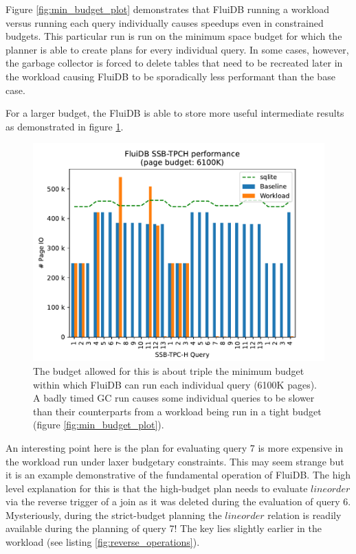 Figure \ref{fig:min_budget_plot} demonstrates that FluiDB running a
workload versus running each query individually causes speedups even
in constrained budgets. This particular run is run on the minimum
space budget for which the planner is able to create plans for every
individual query. In some cases, however, the garbage collector is
forced to delete tables that need to be recreated later in the
workload causing FluiDB to be sporadically less performant than the
base case.

For a larger budget, the FluiDB is able to store more useful
intermediate results as demonstrated in figure
\ref{fig:large_budget_plot}.

\begin{figure}[H]
  \centering
  \includegraphics[width=.9\linewidth]{./plans/workload_6100K.pdf}
  \caption{\label{fig:large_budget_plot} \ioperfdescr The budget
    allowed for this is about triple the minimum budget within which
    FluiDB can run each individual query (6100K pages). A badly timed GC
    run causes some individual queries to be slower than their
    counterparts from a workload being run in a tight budget (figure
    \ref{fig:min_budget_plot}).}
\end{figure}

An interesting point here is the plan for evaluating query 7 is more
expensive in the workload run under laxer budgetary constraints. This
may seem strange but it is an example demonstrative of the fundamental
operation of FluiDB. The high level explanation for this is that the
high-budget plan needs to evaluate \(\mathit{lineorder}\) via the
reverse trigger of a join as it was deleted during the evaluation of
query 6. Mysteriously, during the strict-budget planning the
\(\mathit{lineorder}\) relation is readily available during the
planning of query 7! The key lies slightly earlier in the workload
(see listing \ref{fig:reverse_operations}).

